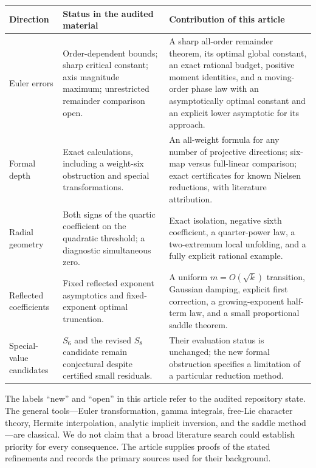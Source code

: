 \begin{longtable}{@{}>{\raggedright\arraybackslash}p{}>{\raggedright\arraybackslash}p{}>{\raggedright\arraybackslash}p{}@{}}
\toprule
Direction & Status in the audited material & Contribution of this article\\
\midrule
\endhead
Euler errors & Order-dependent bounds; sharp critical constant;
axis magnitude maximum; unrestricted remainder comparison open.
& A sharp all-order remainder theorem, its optimal global constant,
an exact rational budget, positive moment identities, and a moving-order
phase law with an asymptotically optimal constant and an explicit
lower asymptotic for its approach.\\[5pt]
Formal depth & Exact calculations, including a weight-six obstruction
and special transformations.
& An all-weight formula for any number of projective directions;
six-map versus full-linear comparison; exact certificates for known
Nielsen reductions, with literature attribution.\\[5pt]
Radial geometry & Both signs of the quartic coefficient on the quadratic
threshold; a diagnostic simultaneous zero.
& Exact isolation, negative sixth coefficient, a quarter-power law,
a two-extremum local unfolding, and a fully explicit rational example.\\[5pt]
Reflected coefficients & Fixed reflected exponent asymptotics and
fixed-exponent optimal truncation.
& A uniform $m=O(\sqrt{k})$ transition, Gaussian damping, explicit
first correction, a growing-exponent half-term law, and a small proportional saddle theorem.\\[5pt]
Special-value candidates & $S_6$ and the revised $S_8$ candidate remain
conjectural despite certified small residuals.
& Their evaluation status is unchanged; the new formal obstruction
specifies a limitation of a particular reduction method.\\
\bottomrule
\end{longtable}
\addtocounter{table}{-1}

The labels ``new'' and ``open'' in this article refer to the audited
repository state. The general tools---Euler transformation, gamma
integrals, free-Lie character theory, Hermite interpolation, analytic
implicit inversion, and the saddle method---are classical. We do not
claim that a broad literature search could establish priority for every
consequence. The article supplies proofs of the stated refinements
and records the primary sources used for their background.

